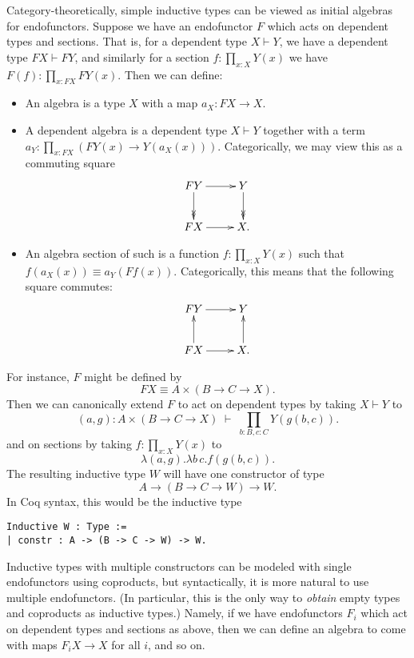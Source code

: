 \documentclass{amsart}
\begin{document}
Category-theoretically, simple inductive types can be viewed as initial algebras for endofunctors.  Suppose we have an endofunctor $F$ which acts on dependent types and sections.  That is, for a dependent type $X\vdash Y$, we have a dependent type $F X\vdash F Y$, and similarly for a section $f:\prod_{x:X} Y(x)$ we have $F(f):\prod_{x:F X} F Y(x)$.  Then we can define:
\begin{itemize}
\item An algebra is a type $X$ with a map $a_X:F X \to X$.
\item A dependent algebra is a dependent type $X\vdash Y$ together with a term $a_Y:\prod_{x:F X} (F Y(x) \to Y(a_X(x)))$.  Categorically, we may view this as a commuting square
  \begin{equation}
  \vcenter{\xymatrix{
      F Y\ar[r]\ar@{->>}[d] &
      Y\ar@{->>}[d]\\
      F X\ar[r] &
      X.
      }}
  \end{equation}
\item An algebra section of such is a function $f:\prod_{x:X} Y(x)$ such that $f(a_X(x)) \equiv a_Y(F f(x))$.  Categorically, this means that the following square commutes:
  \begin{equation}
  \vcenter{\xymatrix{
      F Y\ar[r]\ar@{<-}[d] &
      Y\ar@{<-}[d]\\
      F X\ar[r] &
      X.
      }}
  \end{equation}
\end{itemize}
For instance, $F$ might be defined by
\begin{equation}
  F X \equiv A \times (B \to C \to X).\label{eq:simpleef}
\end{equation}
Then we can canonically extend $F$ to act on dependent types by taking $X\vdash Y$ to
\[ (a,g):A \times (B \to C \to X) \;\vdash\;
\prod_{b:B,c:C} Y(g(b,c)).
\]
and on sections by taking $f:\prod_{x:X} Y(x)$ to
\[ \lambda (a,g). \lambda b\, c. f(g(b,c)). \]
The resulting inductive type $W$ will have one constructor of type
\begin{equation}
  A \to (B\to C \to W) \to W.\label{eq:simplecon}
\end{equation}
In Coq syntax, this would be the inductive type
\begin{verbatim}
Inductive W : Type :=
| constr : A -> (B -> C -> W) -> W.
\end{verbatim}
Inductive types with multiple constructors can be modeled with single endofunctors using coproducts, but syntactically, it is more natural to use multiple endofunctors.  (In particular, this is the only way to \emph{obtain} empty types and coproducts as inductive types.)  Namely, if we have endofunctors $F_i$ which act on dependent types and sections as above, then we can define an algebra to come with maps $F_i X \to X$ for all $i$, and so on.
\end{document}
